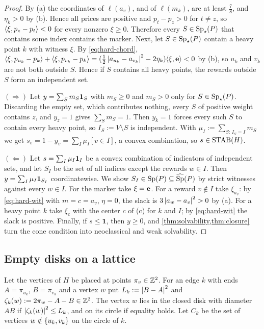 \begin{proof}
By (a) the coordinates of $\ell(a_v)$, and of $\ell(m_k)$, are at least $\frac78$, and $\eta_k>0$ by (b). Hence all prices are positive and $p_t-p_z>0$ for $t\ne z$, so $\langle \xi, p_z-p_t\rangle<0$ for every nonzero $\xi\ge0$. Therefore every $S\in\operatorname{Sp}_\star(P)$ that contains some index contains the marker. Next, let $S\in\operatorname{Sp}_\star(P)$ contain a heavy point $k$ with witness $\xi$. By \eqref{eq:hard-chord}, $\langle \xi, p_{u_k}-p_k\rangle+\langle \xi, p_{v_k}-p_k\rangle=(\frac12\left\lvert a_{u_k}-a_{v_k} \right\rvert^2-2\eta_k)\langle \xi, \mathbf e\rangle<0$ by (b), so $u_k$ and $v_k$ are not both outside $S$. Hence if $S$ contains all heavy points, the rewards outside $S$ form an independent set.

$(\Rightarrow)$ Let $y=\sum_Sm_S\mathbf 1_{S}$ with $m_S\ge0$ and $m_S>0$ only for $S\in\operatorname{Sp}_\star(P)$. Discarding the empty set, which contributes nothing, every $S$ of positive weight contains $z$, and $y_z=1$ gives $\sum_Sm_S=1$. Then $y_k=1$ forces every such $S$ to contain every heavy point, so $I_S:=V\setminus S$ is independent. With $\mu_I:=\sum_{S:\,I_S=I}m_S$ we get $s_v=1-y_v=\sum_I\mu_I[v\in I]$, a convex combination, so $s\in\operatorname{STAB}(H)$.

$(\Leftarrow)$ Let $s=\sum_I\mu_I\mathbf 1_{I}$ be a convex combination of indicators of independent sets, and let $S_I$ be the set of all indices except the rewards $w\in I$. Then $y=\sum_I\mu_I\mathbf 1_{S_I}$ coordinatewise. We show $S_I\in\operatorname{Sp}(P)\subseteq\widehat{\operatorname{Sp}}(P)$ by strict witnesses against every $w\in I$. For the marker take $\xi=\mathbf e$. For a reward $v\notin I$ take $\xi_{a_v}$: by \eqref{eq:hard-wit} with $m=c=a_v$, $\eta=0$, the slack is $3\left\lvert a_w-a_v \right\rvert^2>0$ by (a). For a heavy point $k$ take $\xi_c$ with the center $c$ of (c) for $k$ and $I$; by \eqref{eq:hard-wit} the slack is positive. Finally, if $s\le\mathbf 1$, then $y\ge0$, and \cref{thm:solvability,thm:closure} turn the cone condition into neoclassical and weak solvability.
\end{proof}

\subsection{Empty disks on a lattice}\label{sec:disks}

Let the vertices of $H$ be placed at points $\pi_v\in\mathbb{Z}^2$. For an edge $k$ with ends $A=\pi_{u_k}$, $B=\pi_{v_k}$ and a vertex $w$ put $L_k:=\left\lvert B-A \right\rvert^2$ and $\zeta_k(w):=2\pi_w-A-B\in\mathbb{Z}^2$. The vertex $w$ lies in the closed disk with diameter $AB$ if $\left\lvert \zeta_k(w) \right\rvert^2\le L_k$, and on its circle if equality holds. Let $C_k$ be the set of vertices $w\notin\left\{ u_k,v_k \right\}$ on the circle of $k$.

